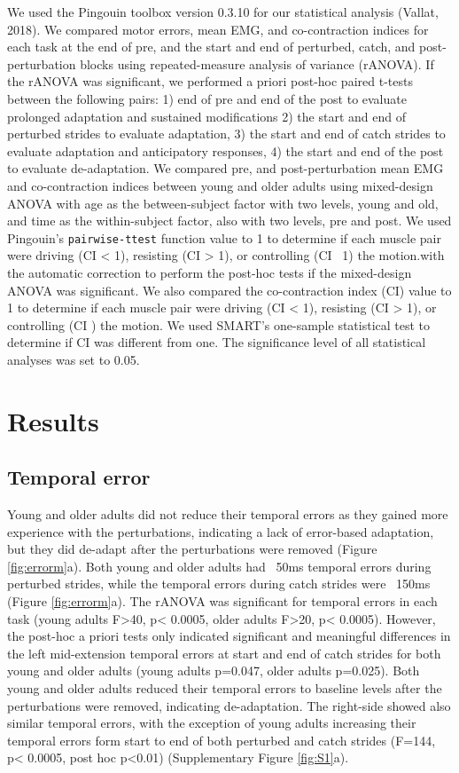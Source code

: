 \documentclass[../thesis_seyed.tex]{subfiles}
\begin{document}
We used the Pingouin toolbox version 0.3.10 for our statistical analysis (Vallat, 2018). We compared motor errors, mean EMG, and co-contraction indices for each task at the end of pre, and the start and end of perturbed, catch, and post-perturbation blocks using repeated-measure analysis of variance (rANOVA). If the rANOVA was significant, we performed a priori post-hoc paired t-tests between the following pairs: 1) end of pre and end of the post to evaluate prolonged adaptation and sustained modifications 2) the start and end of perturbed strides to evaluate adaptation, 3) the start and end of catch strides to evaluate adaptation and anticipatory responses, 4) the start and end of the post to evaluate de-adaptation. We compared pre, and post-perturbation mean EMG and co-contraction indices between young and older adults using mixed-design ANOVA with age as the between-subject factor with two levels, young and old, and time as the within-subject factor, also with two levels, pre and post. We used Pingouin's {\tt pairwise-ttest} function value to 1 to determine if each muscle pair were driving (CI < 1), resisting (CI > 1), or controlling (CI ~1) the motion.with the automatic correction to perform the post-hoc tests if the mixed-design ANOVA was significant. We also compared the co-contraction index (CI) value to 1 to determine if each muscle pair were driving (CI < 1), resisting (CI > 1), or controlling (CI ) the motion. We used SMART's one-sample statistical test to determine if CI was different from one. The significance level of all statistical analyses was set to 0.05.

\section{Results}
\subsection{Temporal error}
Young and older adults did not reduce their temporal errors as they gained more experience with the perturbations, indicating a lack of error-based adaptation, but they did de-adapt after the perturbations were removed (Figure \ref{fig:errorm}a). Both young and older adults had ~50ms temporal errors during perturbed strides, while the temporal errors during catch strides were ~150ms (Figure \ref{fig:errorm}a). The rANOVA was significant for temporal errors in each task (young adults F>40, p< 0.0005, older adults F>20, p< 0.0005). However, the post-hoc a priori tests only indicated significant and meaningful differences in the left mid-extension temporal errors at start and end of catch strides for both young and older adults (young adults p=0.047, older adults p=0.025). Both young and older adults reduced their temporal errors to baseline levels after the perturbations were removed, indicating de-adaptation. The right-side showed also similar temporal errors, with the exception of young adults increasing their temporal errors form start to end of both perturbed and catch strides (F=144, p< 0.0005, post hoc p<0.01) (Supplementary Figure \ref{fig:S1}a).
\end{document}
